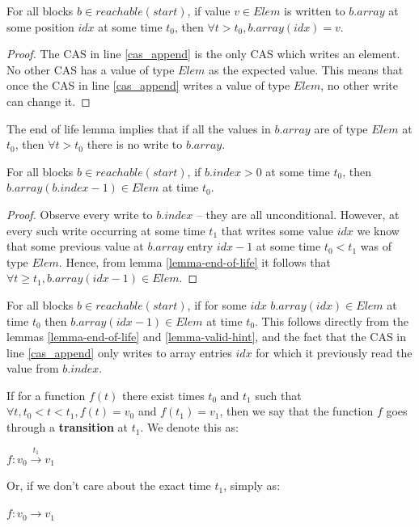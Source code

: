 \documentclass[runningheads,a4paper]{llncs}
\begin{document}
\begin{lemma}\label{lemma-end-of-life}
For all blocks $b \in reachable(start)$, if value $v \in Elem$ is
written to $b.array$ at some position $idx$ at some time $t_0$, then
$\forall t > t_0, b.array(idx) = v$.
\end{lemma}

\begin{proof}
The CAS in line \ref{cas_append} is the only CAS which writes an
element.
No other CAS has a value of type $Elem$ as the expected value.
This means that once the CAS in line \ref{cas_append} writes a value
of type $Elem$, no other write can change it.
\end{proof}


\begin{corollary}\label{cor-end-of-life}
The end of life lemma implies that if all the values in $b.array$ are
of type $Elem$ at $t_0$, then $\forall t > t_0$ there is no write to $b.array$.
\end{corollary}


\begin{lemma}\label{lemma-valid-hint}
For all blocks $b \in reachable(start)$, if $b.index > 0$ at some time $t_0$, then
$b.array(b.index - 1) \in Elem$ at time $t_0$.
\end{lemma}

\begin{proof}
Observe every write to $b.index$ -- they are all unconditional.
However, at every such write occurring at some time $t_1$ that writes
some value $idx$ we know that some previous value at $b.array$ entry $idx - 1$
at some time $t_0 < t_1$ was of type $Elem$.
Hence, from lemma \ref{lemma-end-of-life} it follows that
$\forall t \geq t_1, b.array(idx - 1) \in Elem$.
\end{proof}


\begin{corollary}[Compactness]\label{cor-compactness}
For all blocks $b \in reachable(start)$, if for some $idx$
$b.array(idx) \in Elem$ at time $t_0$ then $b.array(idx - 1) \in Elem$
at time $t_0$. This follows
directly from the lemmas \ref{lemma-end-of-life} and
\ref{lemma-valid-hint}, and the fact that the CAS in line
\ref{cas_append} only writes to array entries $idx$ for which it
previously read the value from $b.index$.
\end{corollary}


\begin{definition}[Transition]
If for a function $f(t)$ there exist times $t_0$ and $t_1$ such that
$\forall t, t_0 < t < t_1, f(t) = v_0$ and $f(t_1) = v_1$, then we say
that the function $f$ goes through a \textbf{transition} at $t_1$. We denote this as:

$f: v_0 \stackrel{t_1}{\rightarrow} v_1$

Or, if we don't care about the exact time $t_1$, simply as:

$f: v_0 \rightarrow v_1$
\end{definition}
\end{document}
